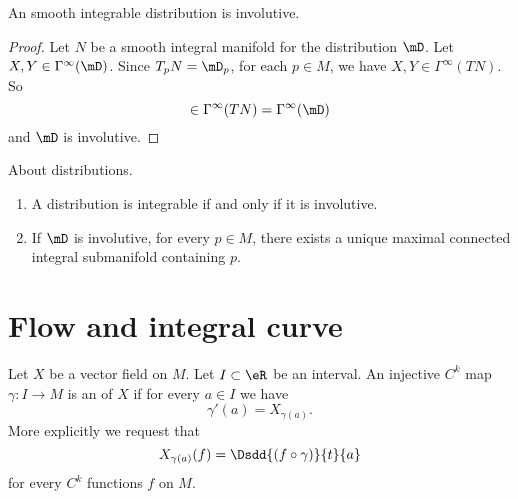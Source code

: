 \begin{proposition}
    An smooth integrable distribution is involutive.
\end{proposition}

\begin{proof}
    Let \( N\) be a smooth integral manifold for the distribution \( \mD\).  Let \( X,Y\in\Gamma^{\infty}(\mD)\). Since \( T_pN=\mD_p\), for each \( p\in M\), we have \( X,Y\in\Gamma^{\infty}(TN)\). So
    \begin{equation}
        [X,Y]\in\Gamma^{\infty}(TN)=\Gamma^{\infty}(\mD)
    \end{equation}
    and \( \mD\) is involutive.
\end{proof}

\begin{theorem}      \label{THOooVRDYooIusxwW}
    About distributions.
    \begin{enumerate}
        \item
            A distribution is integrable if and only if it is involutive.
        \item
            If \( \mD\) is involutive, for every \( p\in M\), there exists a unique maximal connected integral submanifold containing \( p\).
    \end{enumerate}
\end{theorem}


\section{Flow and integral curve}

\begin{definition}      \label{DEFooWTNZooTbxJAH}
    Let \( X\) be a vector field on \( M\). Let \( I\subset \eR\) be an interval. An injective \( C^k\) map \( \gamma\colon I\to M\) is an  of \( X\) if for every \( a\in I\) we have
    \begin{equation}
        \gamma'(a)=X_{\gamma(a)}.
    \end{equation}
    More explicitly we request that
    \begin{equation}       
        X_{\gamma(a)}(f)=\Dsdd{ (f\circ \gamma) }{t}{a}
    \end{equation}
    for every \( C^k\) functions \( f\) on \( M\).
\end{definition}

